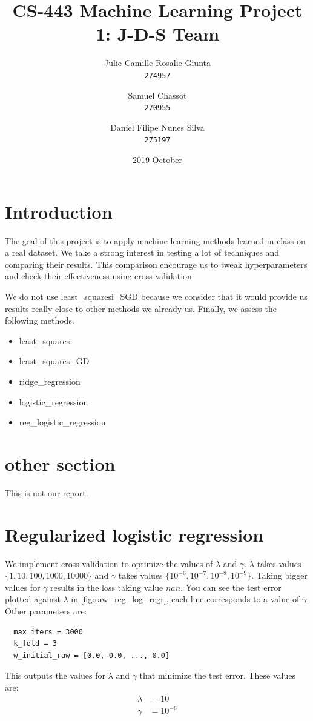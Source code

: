 \documentclass[11pt, a4paper, twoside]{article}
\begin{document}
\date{2019 October}
\title{CS-443 Machine Learning Project 1: J-D-S Team}
\author{
  Julie Camille Rosalie Giunta\\
  \texttt{274957}
  \and
  Samuel Chassot\\
  \texttt{270955}
  \and
  Daniel Filipe Nunes Silva\\
  \texttt{275197}
}

\maketitle
\clearpage

\section{Introduction}
The goal of this project is to apply machine learning
methods learned in class on a real dataset. We take a
strong interest in testing a lot of techniques and
comparing their results. This comparison encourage us to
tweak hyperparameters and check their effectiveness using
cross-validation.

We do not use least\_squaresi\_SGD because we consider
that it would provide us results really close to other
methods we already us. Finally, we assess the following
methods.

\begin{itemize}
  \item least\_squares
  \item least\_squares\_GD 
  \item ridge\_regression
  \item logistic\_regression
  \item reg\_logistic\_regression
\end{itemize}
 
\section{other section}
This is not our report.



\section{Regularized logistic regression}
We implement cross-validation to optimize the values of $\lambda$ and $\gamma$. 
$\lambda$ takes values $\{1,10,100,1000,10000\}$ and $\gamma$ takes values $\{10^{-6},10^{-7},10^{-8},10^{-9}\}$. 
Taking bigger values for $\gamma$ results in the loss taking value $nan$. 
You can see the test error plotted against $\lambda$ in \ref{fig:raw_reg_log_regr}, 
each line corresponds to a value of $\gamma$.
Other parameters are:
\begin{lstlisting}
  max_iters = 3000
  k_fold = 3
  w_initial_raw = [0.0, 0.0, ..., 0.0]
\end{lstlisting}
This outputs the values for $\lambda$ and $\gamma$ that minimize the test error. These values are:
\begin{align*}
  \lambda &= 10 \\
  \gamma &= 10^{-6}
\end{align*}
\end{document}
